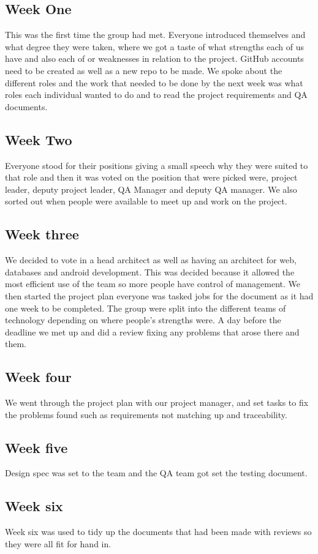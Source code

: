 \subsection{Week One}
	This was the first time the group had met. Everyone introduced themselves and what degree they were taken, where we got a taste of what strengths each of us have and also each of or weaknesses in relation to the project. GitHub accounts need to be created as well as a new repo to be made. We spoke about the different roles and the work that needed to be done by the next week was what roles each individual wanted to do and to read the project requirements and QA documents.
\subsection{Week Two}
	Everyone stood for their positions giving a small speech why they were suited to that role and then it was voted on the position that were picked were, project leader, deputy project leader, QA Manager and deputy QA manager. We also sorted out when people were available to meet up and work on the project.
\subsection{Week three}
	We decided to vote in a head architect as well as having an architect for web, databases and android development. This was decided because it allowed the most efficient use of the team so more people have control of management. We then started the project plan everyone was tasked jobs for the document as it had one week to be completed. The group were split into the different teams of technology depending on where people’s strengths were. A day before the deadline we met up and did a review fixing any problems that arose there and them.
\subsection{Week four}
	We went through the project plan with our project manager, and set tasks to fix the problems found such as requirements not matching up and traceability. 
\subsection{Week five}
	Design spec was set to the team and the QA team got set the testing document.
\subsection{Week six}
	Week six was used to tidy up the documents that had been made with reviews so they were all fit for hand in.
